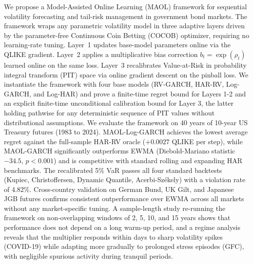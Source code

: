 We propose a Model-Assisted Online Learning (MAOL) framework for sequential volatility forecasting and tail-risk management in government bond markets. The framework wraps any parametric volatility model in three adaptive layers driven by the parameter-free Continuous Coin Betting (COCOB) optimizer, requiring no learning-rate tuning. Layer~1 updates base-model parameters online via the QLIKE gradient. Layer~2 applies a multiplicative bias correction $b_t = \exp(\rho_t)$ learned online on the same loss. Layer~3 recalibrates Value-at-Risk in probability integral transform (PIT) space via online gradient descent on the pinball loss. We instantiate the framework with four base models (RV-GARCH, HAR-RV, Log-GARCH, and Log-HAR) and prove a finite-time regret bound for Layers 1-2 and an explicit finite-time unconditional calibration bound for Layer 3, the latter holding pathwise for any deterministic sequence of PIT values without distributional assumptions. We evaluate the framework on 40 years of 10-year US Treasury futures (1983 to 2024). MAOL-Log-GARCH achieves the lowest average regret against the full-sample HAR-RV oracle ($+0.0027$ QLIKE per step), while MAOL-GARCH significantly outperforms EWMA (Diebold-Mariano statistic $-34.5$, $p < 0.001$) and is competitive with standard rolling and expanding HAR benchmarks. The recalibrated 5\% VaR passes all four standard backtests (Kupiec, Christoffersen, Dynamic Quantile, Acerbi-Sz\'ekely) with a violation rate of 4.82\%. Cross-country validation on German Bund, UK Gilt, and Japanese JGB futures confirms consistent outperformance over EWMA across all markets without any market-specific tuning. A sample-length study re-running the framework on non-overlapping windows of 2, 5, 10, and 15 years shows that performance does not depend on a long warm-up period, and a regime analysis reveals that the multiplier responds within days to sharp volatility spikes (COVID-19) while adapting more gradually to prolonged stress episodes (GFC), with negligible spurious activity during tranquil periods.

